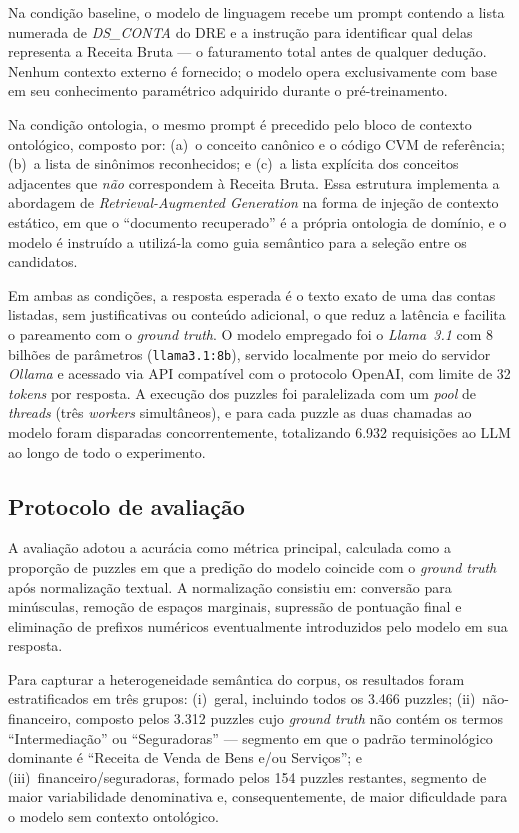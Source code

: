 \documentclass[12pt,a4paper]{article}
\begin{document}
Na condição baseline, o modelo de linguagem recebe um prompt contendo a lista numerada de \textit{DS\_CONTA} do DRE e a instrução para identificar qual delas representa a Receita Bruta --- o faturamento total antes de qualquer dedução. Nenhum contexto externo é fornecido; o modelo opera exclusivamente com base em seu conhecimento paramétrico adquirido durante o pré-treinamento.

Na condição ontologia, o mesmo prompt é precedido pelo bloco de contexto ontológico, composto por: (a)~o conceito canônico e o código CVM de referência; (b)~a lista de sinônimos reconhecidos; e (c)~a lista explícita dos conceitos adjacentes que \textit{não} correspondem à Receita Bruta. Essa estrutura implementa a abordagem de \textit{Retrieval-Augmented Generation} na forma de injeção de contexto estático, em que o ``documento recuperado'' é a própria ontologia de domínio, e o modelo é instruído a utilizá-la como guia semântico para a seleção entre os candidatos.

Em ambas as condições, a resposta esperada é o texto exato de uma das contas listadas, sem justificativas ou conteúdo adicional, o que reduz a latência e facilita o pareamento com o \textit{ground truth}. O modelo empregado foi o \textit{Llama~3.1} com 8 bilhões de parâmetros (\texttt{llama3.1:8b}), servido localmente por meio do servidor \textit{Ollama} e acessado via API compatível com o protocolo OpenAI, com limite de 32 \textit{tokens} por resposta. A execução dos puzzles foi paralelizada com um \textit{pool} de \textit{threads} (três \textit{workers} simultâneos), e para cada puzzle as duas chamadas ao modelo foram disparadas concorrentemente, totalizando 6.932 requisições ao LLM ao longo de todo o experimento.

\subsection{Protocolo de avaliação}

A avaliação adotou a acurácia como métrica principal, calculada como a proporção de puzzles em que a predição do modelo coincide com o \textit{ground truth} após normalização textual. A normalização consistiu em: conversão para minúsculas, remoção de espaços marginais, supressão de pontuação final e eliminação de prefixos numéricos eventualmente introduzidos pelo modelo em sua resposta.

Para capturar a heterogeneidade semântica do corpus, os resultados foram estratificados em três grupos: (i)~geral, incluindo todos os 3.466 puzzles; (ii)~não-financeiro, composto pelos 3.312 puzzles cujo \textit{ground truth} não contém os termos ``Intermediação'' ou ``Seguradoras'' --- segmento em que o padrão terminológico dominante é ``Receita de Venda de Bens e/ou Serviços''; e (iii)~financeiro/seguradoras, formado pelos 154 puzzles restantes, segmento de maior variabilidade denominativa e, consequentemente, de maior dificuldade para o modelo sem contexto ontológico.
\end{document}
